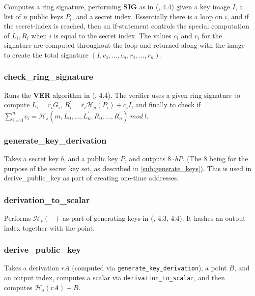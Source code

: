 \documentclass[12pt,english]{mrl}
\numberwithin{equation}{section}
\numberwithin{figure}{section}
\begin{document}
Computes a ring signature, performing \textbf{SIG} as in (\cite{CN},
4.4) given a key image $I$, a list of $n$ public keys $P_{i}$,
and a secret index. Essentially there is a loop on $i$, and if the
secret-index is reached, then an if-statement controls the special
computation of $L_{i},R_{i}$ when $i$ is equal to the secret index.
The values $c_{i}$ and $r_{i}$ for the signature are computed throughout
the loop and returned along with the image to create the total signature
$\left(I,c_{1},...,c_{n},r_{1},...,r_{n}\right).$ 


\subsubsection{check\_ring\_signature}

Runs the \textbf{VER} algorithm in (\cite{CN}, 4.4). The verifier
uses a given ring signature to compute $L_{i}^{\prime}=r_{i}G_{i}$,
$R_{i}^{\prime}=r_{i}\mathcal{H}_{p}\left(P_{i}\right)+c_{i}I$, and
finally to check if $\sum_{i=0}^{n}c_{i}=\mathcal{H}_{s}\left(m,L_{0}^{\prime},...,L_{n}^{\prime},R_{0}^{\prime},...,R_{n}^{\prime}\right)\ mod\ l$. 


\subsubsection{generate\_key\_derivation}

Takes a secret key $b$, and a public key $P$, and outputs $8\cdot bP$.
(The $8$ being for the purpose of the secret key set, as described
in \ref{sub:generate_keys}). This is used in derive\_public\_key
as part of creating one-time addresses. 


\subsubsection{derivation\_to\_scalar}

Performs $\mathcal{H}_{s}\left(-\right)$ as part of generating keys in
(\cite{CN}, 4.3, 4.4). It hashes an output index together with the
point. 


\subsubsection{derive\_public\_key}

Takes a derivation $rA$ (computed via \texttt{generate\_key\_derivation}),
a point $B$, and an output index, computes a scalar via \texttt{derivation\_to\_scalar},
and then computes $\mathcal{H}_{s}\left(rA\right)+B$. 
\end{document}

